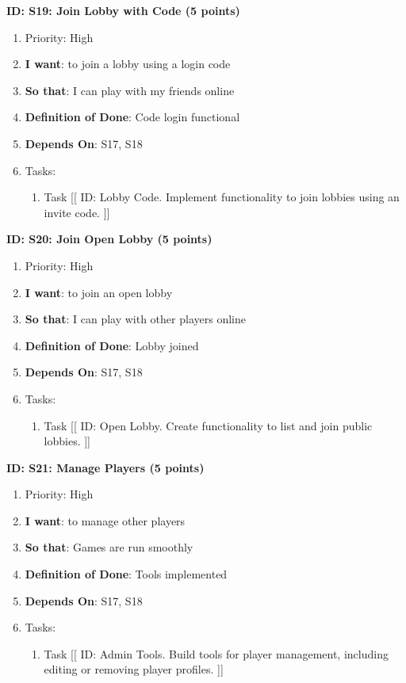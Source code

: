 \textbf{ID: S19: Join Lobby with Code (5 points)}
\begin{enumerate}
    \item Priority: High
    \item \textbf{I want}: to join a lobby using a login code
    \item \textbf{So that}: I can play with my friends online
    \item \textbf{Definition of Done}: Code login functional
    \item \textbf{Depends On}: S17, S18
    \item Tasks:
    \begin{enumerate}
        \item Task [[ ID: Lobby Code. Implement functionality to join lobbies using an invite code. ]]
    \end{enumerate}
\end{enumerate}

\textbf{ID: S20: Join Open Lobby (5 points)}
\begin{enumerate}
    \item Priority: High
    \item \textbf{I want}: to join an open lobby
    \item \textbf{So that}: I can play with other players online
    \item \textbf{Definition of Done}: Lobby joined
    \item \textbf{Depends On}: S17, S18
    \item Tasks:
    \begin{enumerate}
        \item Task [[ ID: Open Lobby. Create functionality to list and join public lobbies. ]]
    \end{enumerate}
\end{enumerate}

\textbf{ID: S21: Manage Players (5 points)}
\begin{enumerate}
    \item Priority: High
    \item \textbf{I want}: to manage other players
    \item \textbf{So that}: Games are run smoothly
    \item \textbf{Definition of Done}: Tools implemented
    \item \textbf{Depends On}: S17, S18
    \item Tasks:
    \begin{enumerate}
        \item Task [[ ID: Admin Tools. Build tools for player management, including editing or removing player profiles. ]]
    \end{enumerate}
\end{enumerate}

